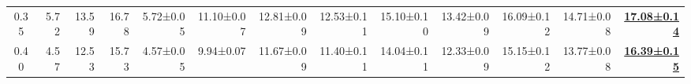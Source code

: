 \documentclass[a4paper,10pt,conference,onecolumn]{IEEEtran}
\begin{document}
\begin{table*}[b]
{\begin{tabular}{@{}crrrrrrrrrrrr@{}}
			0.35        & 5.72                                       & 13.59                                                                    & 16.78                                 & 5.72±0.05                     & 11.10±0.07                            & 12.81±0.09                            & 12.53±0.11                            & 15.10±0.10                            & 13.42±0.09                            & 16.09±0.12                            & 14.71±0.08                            & \underline{\textbf{17.08±0.14}}       \\
			0.40        & 4.57                                       & 12.53                                                                    & 15.73                                 & 4.57±0.05                     & 9.94±0.07                             & 11.67±0.09                            & 11.40±0.11                            & 14.04±0.11                            & 12.33±0.09                            & 15.15±0.12                            & 13.77±0.08                            & \underline{\textbf{16.39±0.15}}       \\
			\bottomrule
		\end{tabular}
	}
\end{table*}
\end{document}
